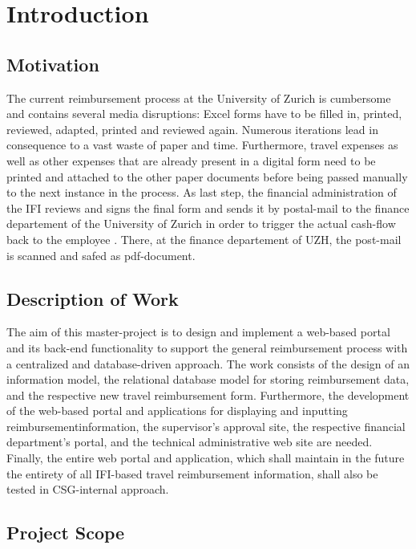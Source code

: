 \chapter{Introduction}

\section{Motivation}

The current reimbursement process at the University of Zurich is cumbersome and contains several media disruptions: Excel forms have to be filled in, printed, reviewed, adapted, printed and reviewed again. Numerous iterations lead in consequence to a vast waste of paper and time. Furthermore, travel expenses as well as other expenses that are already present in a digital form need to be printed and attached to the other paper documents before being passed manually to the next instance in the process. As last step, the financial administration of the IFI reviews and signs the final form and sends it by postal-mail to the finance departement of the University of Zurich in order to trigger the actual cash-flow back to the employee \cite{ifi}. There, at the finance departement of UZH, the post-mail is scanned and safed as pdf-document.

\section{Description of Work}

The aim of this master-project is to design and implement a web-based portal and its back-end functionality to support the general reimbursement process with a centralized and database-driven approach. The work consists of the design of an information model, the relational database model for storing reimbursement data, and the respective new travel reimbursement form. Furthermore, the development of the web-based portal and applications for displaying and inputting reimbursementinformation, the supervisor’s approval site, the respective financial department’s portal, and the technical administrative web site are needed. Finally, the entire web portal and application, which shall maintain in the future the entirety of all IFI-based travel reimbursement information, shall also be tested in CSG-internal approach.


\section{Project Scope}

